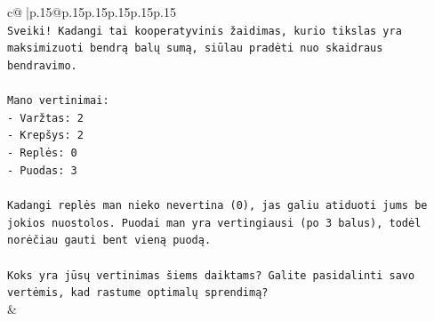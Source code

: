 \documentclass{article}
\begin{document}
{\begin{supertabular}{c@{$\;$}|p{.15\linewidth}@{}p{.15\linewidth}p{.15\linewidth}p{.15\linewidth}p{.15\linewidth}p{.15\linewidth}}
{{{\\ 
\texttt{Sveiki! Kadangi tai kooperatyvinis žaidimas, kurio tikslas yra maksimizuoti bendrą balų sumą, siūlau pradėti nuo skaidraus bendravimo.} \\
\\ 
\texttt{Mano vertinimai:} \\
\texttt{{-} Varžtas: 2} \\
\texttt{{-} Krepšys: 2} \\
\texttt{{-} Replės: 0} \\
\texttt{{-} Puodas: 3} \\
\\ 
\texttt{Kadangi replės man nieko nevertina (0), jas galiu atiduoti jums be jokios nuostolos. Puodai man yra vertingiausi (po 3 balus), todėl norėčiau gauti bent vieną puodą.} \\
\\ 
\texttt{Koks yra jūsų vertinimas šiems daiktams? Galite pasidalinti savo vertėmis, kad rastume optimalų sprendimą?} \\
            }
        }
    }
    & \\ \\


\end{supertabular}}
\end{document}
